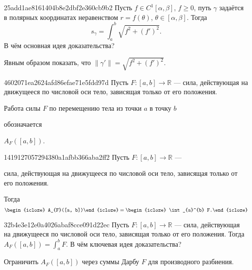 \begin{note}{25add1ae8161404b8e2dbf2e360cb9b2}
    Пусть \({ f \in C^{1}[\alpha, \beta] }\), \({ f \geqslant 0 }\), путь \({ \gamma }\) задаётся в полярных координатах неравенством \({ r = f(\theta) }\),\: \({ \theta \in [\alpha, \beta] }\). Тогда
    \[
        s_\gamma = \int_{a}^{b} \sqrt{f^2 + (f')^2}.
    \]
    В чём основная идея доказательства?

    \begin{cloze}{1}
        Явным образом показать, что \({ \left\lVert \gamma' \right\rVert = \sqrt{f^2 + (f')^2} }\).
    \end{cloze}
\end{note}

\begin{note}{4602071ea2624afd86efae71e5fdd97d}
    Пусть \({ F : [a, b] \to \mathbb R }\) --- сила, действующая на движущееся по числовой оси тело, зависящая только от его положения.
    \begin{icloze}{1}Работа силы \({ F }\) по перемещению тела из точки \({ a }\) в точку \({ b }\)\end{icloze} обозначается \begin{icloze}{2}\({ A_{F}([a, b]) }\).\end{icloze}
\end{note}

\begin{note}{1419127057294380a1afbb366aba2ff2}
    Пусть \({ F : [a, b] \to \mathbb R }\) --- \begin{icloze}{3}сила, действующая на движущееся по числовой оси тело, зависящая только от его положения.\end{icloze}
    Тогда
    \[
        \begin{icloze}{2}A_{F}([a, b])\end{icloze} = \begin{icloze}{1}\int_{a}^{b} F.\end{icloze}
    \]
\end{note}

\begin{note}{32b4e3e12e0a4026abaf8cce091d22ec}
    Пусть \({ F : [a, b] \to \mathbb R }\) --- сила, действующая на движущееся по числовой оси тело, зависящая только от его положения.
    Тогда \({ A_{F}([a, b]) = \int_{a}^{b} F }\).
    В чём ключевая идея доказательства?

    \begin{cloze}{1}
        Ограничить \({ A_{F}([a, b]) }\) через суммы Дарбу \({ F }\) для производного разбиения.
    \end{cloze}
\end{note}

